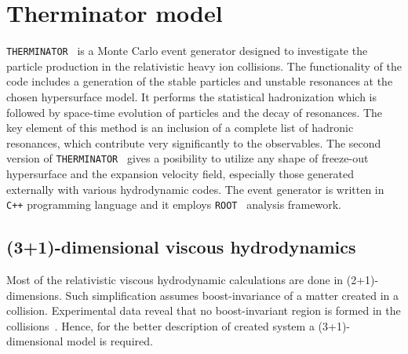 \chapter{Therminator model}
  \verb|THERMINATOR|~\cite{therminator} is a Monte Carlo event generator designed to investigate the particle production in the relativistic heavy ion collisions.
  The functionality of the code includes a generation of the stable particles and unstable resonances at the chosen hypersurface model.
  It performs the statistical hadronization which is followed by space-time evolution of particles and the decay of resonances.
  The key element of this method is an inclusion of a complete list of hadronic resonances, which contribute very significantly to the observables.
  The second version of \verb|THERMINATOR|~\cite{therminator2} gives a posibility to utilize any shape of freeze-out hypersurface and the expansion velocity field, especially those generated externally with various hydrodynamic codes.
  The event generator is written in \verb|C++| programming language and it employs \verb|ROOT|~\cite{root} analysis framework.
  \section{(3+1)-dimensional viscous hydrodynamics}
  Most of the relativistic viscous hydrodynamic calculations are done in \mbox{(2+1)-dimensions}.
  Such simplification assumes boost-invariance of a matter created in a collision.
  Experimental data reveal that no boost-invariant region is formed in the collisions~\cite{chmeson}.
  Hence, for the better description of created system a \mbox{(3+1)-dimensional} model is required.

